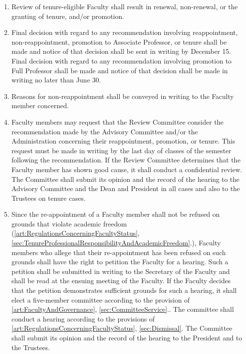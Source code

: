 \documentclass{manual}
\newcommand{\itemLevelA}{\alph*.}
\newcommand{\itemRefA}{\alph*}
\begin{document}
	\begin{enumerate}[label=\itemLevelA,ref=\itemRefA]
	\item Review of tenure-eligible Faculty shall result in renewal, non-renewal, or the granting of tenure, and/or promotion.
	\item Final decision with regard to any recommendation involving reappointment, non-reappointment, promotion to Associate Professor, or tenure shall be made and notice of that decision shall be sent in writing by December 15. Final decision with regard to any recommendation involving promotion to Full Professor shall be made and notice of that decision shall be made in writing no later than June 30. 
	\item Reasons for non-reappointment shall be conveyed in writing to the Faculty member concerned.
	\item Faculty members may request that the Review Committee consider the recommendation made by the Advisory Committee and/or the Administration concerning their reappointment, promotion, or tenure. This request must be made in writing by the last day of classes of the semester following the recommendation. If the Review Committee determines that the Faculty member has shown good cause, it shall conduct a confidential review. The Committee shall submit its opinion and the record of the hearing to the Advisory Committee and the Dean and President in all cases and also to the Trustees on tenure cases.
	\item Since the re-appointment of a Faculty member shall not be refused on grounds that violate academic freedom (\cref{art:RegulationsConcerningFacultyStatus}, \cref{sec:TenureProfessionalResponsibilityAndAcademicFreedom}.), Faculty members who allege that their re-appointment has been refused on such grounds shall have the right to petition the Faculty for a hearing. Such a petition shall be submitted in writing to the Secretary of the Faculty and shall be read at the ensuing meeting of the Faculty. If the Faculty decides that the petition demonstrates sufficient grounds for such a hearing, it shall elect a five-member committee according to the provision of \cref{art:FacultyAndGovernance}, \cref{sec:CommitteeService}.. The committee shall conduct a hearing according to the provisions of \cref{art:RegulationsConcerningFacultyStatus}, \cref{sec:Dismissal}. The Committee shall submit its opinion and the record of the hearing to the President and to the Trustees.
	\end{enumerate}
\end{document}
